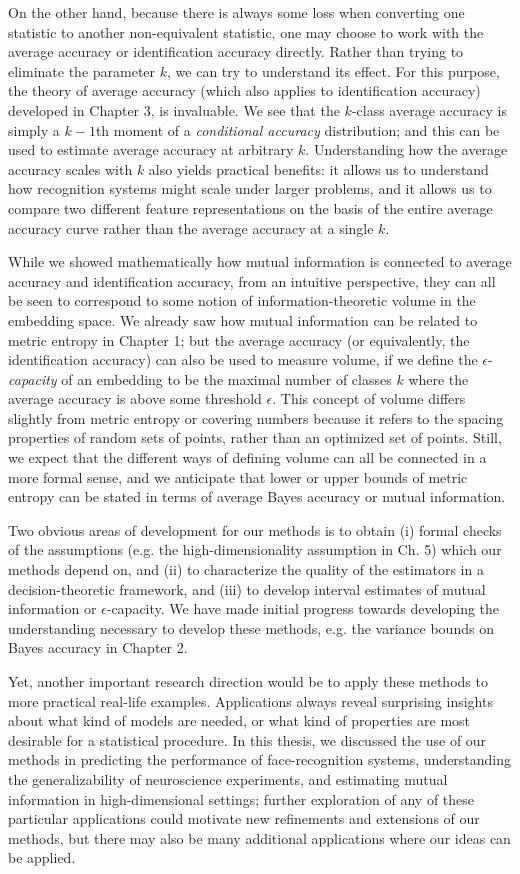 On the other hand, because there is always some loss when converting
one statistic to another non-equivalent statistic, one may choose to
work with the average accuracy or identification accuracy directly.
Rather than trying to eliminate the parameter $k$, we can try to
understand its effect.  For this purpose, the theory of average
accuracy (which also applies to identification accuracy) developed in
Chapter 3, is invaluable.  We see that the $k$-class average accuracy
is simply a $k-1$th moment of a \emph{conditional accuracy}
distribution; and this can be used to estimate average accuracy at
arbitrary $k$.  Understanding how the average accuracy scales with $k$
also yields practical benefits: it allows us to understand how
recognition systems might scale under larger problems, and it allows
us to compare two different feature representations on the basis of
the entire average accuracy curve rather than the average accuracy at
a single $k$.

While we showed mathematically how mutual information is connected to
average accuracy and identification accuracy, from an intuitive
perspective, they can all be seen to correspond to some notion of
information-theoretic volume in the embedding space.  We already saw
how mutual information can be related to metric entropy in Chapter 1;
but the average accuracy (or equivalently, the identification
accuracy) can also be used to measure volume, if we define the
$\epsilon$-\emph{capacity} of an embedding to be the maximal number of classes $k$
where the average accuracy is above some threshold $\epsilon$.  This
concept of volume differs slightly from metric entropy or covering
numbers because it refers to the spacing properties of random sets of
points, rather than an optimized set of points.  Still, we expect that
the different ways of defining volume can all be connected in a more
formal sense, and we anticipate that lower or upper bounds of metric
entropy can be stated in terms of average Bayes accuracy or mutual
information.

Two obvious areas of development for our methods is to obtain (i)
formal checks of the assumptions (e.g. the high-dimensionality
assumption in Ch. 5) which our methods depend on, and (ii) to
characterize the quality of the estimators in a decision-theoretic
framework, and (iii) to develop interval estimates of mutual
information or $\epsilon$-capacity.  We have made initial progress
towards developing the understanding necessary to develop these
methods, e.g. the variance bounds on Bayes accuracy in Chapter 2.

Yet, another important research direction would be to apply these
methods to more practical real-life examples.  Applications always
reveal surprising insights about what kind of models are needed, or
what kind of properties are most desirable for a statistical
procedure.  In this thesis, we discussed the use of our methods in
predicting the performance of face-recognition systems, understanding
the generalizability of neuroscience experiments, and estimating
mutual information in high-dimensional settings; further exploration
of any of these particular applications could motivate new refinements
and extensions of our methods, but there may also be many additional
applications where our ideas can be applied.

